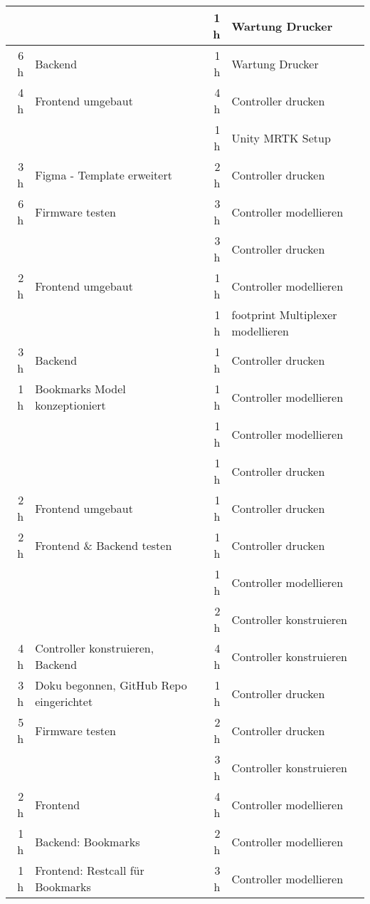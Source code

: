 \begin{table}[htbp]
\begin{tabular}{|r|l|r|l|}
    \hline
          &       & 1 h   & Wartung Drucker \\
    \hline
    6 h   & Backend & 1 h   & Wartung Drucker \\
    \hline
    4 h   & Frontend umgebaut & 4 h   & Controller drucken \\
    \hline
          &       & 1 h   & Unity MRTK Setup \\
    \hline
    3 h   & Figma - Template erweitert & 2 h   & Controller drucken \\
    \hline
    6 h   & Firmware testen & 3 h   & Controller modellieren \\
    \hline
          &       & 3 h   & Controller drucken \\
    \hline
    2 h   & Frontend umgebaut & 1 h   & Controller modellieren \\
    \hline
          &       & 1 h   & footprint Multiplexer modellieren \\
    \hline
    3 h   & Backend & 1 h   & Controller drucken \\
    \hline
    1 h   & Bookmarks Model konzeptioniert & 1 h   & Controller modellieren \\
    \hline
          &       & 1 h   & Controller modellieren \\
    \hline
          &       & 1 h   & Controller drucken \\
    \hline
    2 h   & Frontend umgebaut & 1 h   & Controller drucken \\
    \hline
    2 h   & Frontend  \& Backend testen & 1 h   & Controller drucken \\
    \hline
          &       & 1 h   & Controller modellieren \\
    \hline
          &       & 2 h   & Controller konstruieren \\
    \hline
    4 h   & Controller konstruieren, Backend & 4 h   & Controller konstruieren \\
    \hline
    3 h   & Doku begonnen, GitHub Repo eingerichtet & 1 h   & Controller drucken \\
    \hline
    5 h   & Firmware testen & 2 h   & Controller drucken \\
    \hline
          &       & 3 h   & Controller konstruieren \\
    \hline
    2 h   & Frontend & 4 h   & Controller modellieren \\
    \hline
    1 h   & Backend: Bookmarks & 2 h   & Controller modellieren \\
    \hline
    1 h   & Frontend: Restcall für Bookmarks & 3 h   & Controller modellieren \\

\end{tabular}
\end{table}
